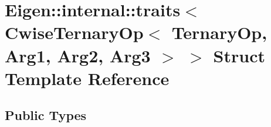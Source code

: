 \hypertarget{struct_eigen_1_1internal_1_1traits_3_01_cwise_ternary_op_3_01_ternary_op_00_01_arg1_00_01_arg2_00_01_arg3_01_4_01_4}{}\section{Eigen\+::internal\+::traits$<$ Cwise\+Ternary\+Op$<$ Ternary\+Op, Arg1, Arg2, Arg3 $>$ $>$ Struct Template Reference}
\label{struct_eigen_1_1internal_1_1traits_3_01_cwise_ternary_op_3_01_ternary_op_00_01_arg1_00_01_arg2_00_01_arg3_01_4_01_4}
\subsection*{Public Types}
